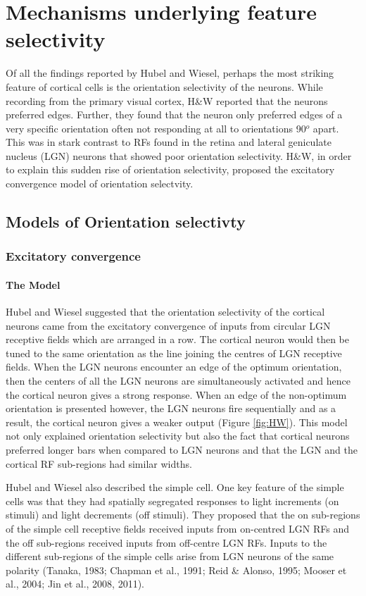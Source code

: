 \section{Mechanisms underlying feature selectivity}

Of all the findings reported by Hubel and Wiesel, perhaps the most striking feature of cortical cells is the orientation selectivity of the neurons. While recording from the primary visual cortex, H\&W reported that the neurons preferred edges. Further, they found that the neuron only preferred edges of a very specific orientation often not responding at all to orientations 90$^o$ apart. This was in stark contrast to RFs found in the retina and lateral geniculate nucleus (LGN) neurons that showed poor orientation selectivity. H\&W, in order to explain this sudden rise of orientation selectivity, proposed the excitatory convergence model of orientation selectvity.

\subsection{Models of Orientation selectivty}

\subsubsection{Excitatory convergence}

\paragraph{The Model}Hubel and Wiesel suggested that the orientation selectivity of the cortical neurons came from the excitatory convergence of inputs from circular LGN receptive fields which are arranged in a row. The cortical neuron would then be tuned to the same orientation as the line joining the centres of LGN receptive fields. When the LGN neurons encounter an edge of the optimum orientation, then the centers of all the LGN neurons are simultaneously activated and hence the cortical neuron gives a strong response. When an edge of the non-optimum orientation is presented however, the LGN neurons fire sequentially and as a result, the cortical neuron gives a weaker output (Figure \ref{fig:HW}). This model not only explained orientation selectivity but also the fact that cortical neurons preferred longer bars when compared to LGN neurons and that the LGN and the cortical RF sub-regions had similar widths.

Hubel and Wiesel also described the simple cell. One key feature of the simple cells was that they had spatially segregated responses to light increments (on stimuli) and light decrements (off stimuli). They proposed that the on sub-regions of the simple cell receptive fields received inputs from on-centred LGN RFs and the off sub-regions received inputs from off-centre LGN RFs. Inputs to the different sub-regions of the simple cells arise from LGN neurons of the same polarity (Tanaka, 1983; Chapman et al., 1991; Reid \& Alonso, 1995; Mooser et al., 2004; Jin et al., 2008, 2011). 

